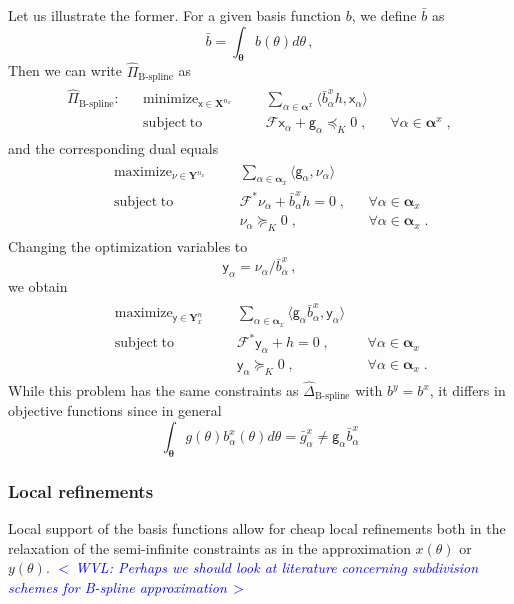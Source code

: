 \documentclass{article}
\DeclareMathOperator*{\minimize}{minimize}
\DeclareMathOperator*{\maximize}{maximize}
\DeclareMathOperator*{\subj}{subject\;to}
\newcommand{\commentWVL}[1]{\noindent \textcolor{blue}{\emph{$<\,$WVL: #1$\,>$}}}%
\newcommand{\ppar}{\theta}                          %
\newcommand{\Ppar}{{\bm{\theta}}}                   %
\newcommand{\X}{\mathbf{X}}                         %
\newcommand{\Y}{\mathbf{Y}}                         %
\newcommand{\calF}{\mathcal{F}}                     %
\newcommand{\cx}{\textsf{x}}        %
\newcommand{\cy}{\textsf{y}}        %
\newcommand{\Alpha}{\bm{\alpha}}    %
\newcommand{\cg}{\textsf{g}}            %
\begin{document}
Let us illustrate the former. For a given basis function $b$, we define $\bar{b}$ as
\[ \bar{b} = \int_{\Ppar} b(\ppar) d\ppar  \,,
\]
Then we can write $\hat{\Pi}_\text{B-spline}$ as
\begin{gather*}
\begin{aligned}
\hat{\Pi}_\text{B-spline}: && \minimize_{\cx\in\X^{n_x}} &&& \sum_{\alpha\in\Alpha^x} \langle \bar{b}^x_\alpha h, \cx_\alpha \rangle    \\%
                           && \subj                      &&& \calF \cx_\alpha + \cg_\alpha \preceq_K 0 \;, && \forall \alpha\in \Alpha^x\;,%
\end{aligned}
\end{gather*}
and the corresponding dual equals
\begin{gather*}
\begin{aligned}
 && \maximize_{\nu\in\Y^{n_x}} &&& \sum_{\alpha\in\Alpha_x} \langle \cg_\alpha, \nu_\alpha \rangle    \\%
 && \subj                      &&& \calF^* \nu_\alpha +  \bar{b}^x_\alpha h = 0 \;, && \forall \alpha\in \Alpha_x\\%
 &&                            &&& \nu_\alpha \succeq_K 0 \;, && \forall \alpha\in \Alpha_x\;.%
\end{aligned}
\end{gather*}
Changing the optimization variables to
\[ \cy_\alpha = \nu_\alpha / \bar{b}^x_\alpha \,,
\]
we obtain
\begin{gather*}
\begin{aligned}
 && \maximize_{\cy\in\Y^n_x} &&& \sum_{\alpha\in\Alpha_x} \langle \cg_\alpha \bar{b}^x_\alpha , \cy_\alpha \rangle    \\%
 && \subj                    &&& \calF^* \cy_\alpha + h = 0 \;, && \forall \alpha\in \Alpha_x\\%
 &&                          &&& \cy_\alpha \succeq_K 0 \;, && \forall \alpha\in \Alpha_x\;.%
\end{aligned}
\end{gather*}
While this problem has the same constraints as $\hat{\Delta}_{\text{B-spline}}$ with $b^y=b^x$, it differs in objective functions since in general
\[ \int_\Ppar g(\ppar)b^x_\alpha(\ppar)d\ppar = \bar{g}^x_\alpha \neq \cg_\alpha \bar{b}^x_\alpha%
\]



\subsubsection{Local refinements}
Local support of the basis functions allow for cheap local refinements both in the relaxation of the semi-infinite constraints as in the approximation $x(\ppar)$ or $y(\ppar)$.
\commentWVL{Perhaps we should look at literature concerning subdivision schemes
for B-spline approximation}
\end{document}

